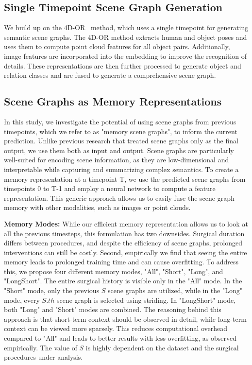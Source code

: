 \documentclass[runningheads]{llncs}
\begin{document}
\subsection{Single Timepoint Scene Graph Generation}
\label{single_timepoint}
We build up on the 4D-OR~\cite{ozsoy20224d} method, which uses a single timepoint for generating semantic scene graphs. The 4D-OR method extracts human and object poses and uses them to compute point cloud features for all object pairs. Additionally, image features are incorporated into the embedding to improve the recognition of details. These representations are then further processed to generate object and relation classes and are fused to generate a comprehensive scene graph.

\subsection{Scene Graphs as Memory Representations}
\label{memory_sg}
In this study, we investigate the potential of using scene graphs from previous timepoints, which we refer to as "memory scene graphs", to inform the current prediction. Unlike previous research that treated scene graphs only as the final output, we use them both as input and output. Scene graphs are particularly well-suited for encoding scene information, as they are low-dimensional and interpretable while capturing and summarizing complex semantics. To create a memory representation at a timepoint T, we use the predicted scene graphs from timepoints 0 to T-1 and employ a neural network to compute a feature representation. This generic approach allows us to easily fuse the scene graph memory with other modalities, such as images or point clouds.

\noindent \textbf{Memory Modes:} While our efficient memory representation allows us to look at all the previous timesteps, this formulation has two downsides. Surgical duration differs between procedures, and despite the efficiency of scene graphs, prolonged interventions can still be costly. Second, empirically we find that seeing the entire memory leads to prolonged training time and can cause overfitting. To address this, we propose four different memory modes, "All", "Short", "Long", and "LongShort". The entire surgical history is visible only in the "All" mode. In the "Short" mode, only the previous $S$ scene graphs are utilized, while in the "Long" mode, every $S.th$ scene graph is selected using striding. In "LongShort" mode, both "Long" and "Short" modes are combined. The reasoning behind this approach is that short-term context should be observed in detail, while long-term context can be viewed more sparsely. This reduces computational overhead compared to "All" and leads to better results with less overfitting, as observed empirically. The value of $S$ is highly dependent on the dataset and the surgical procedures under analysis.
\end{document}
